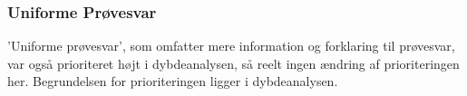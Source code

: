 \subsubsection{Uniforme Prøvesvar}
’Uniforme prøvesvar’, som omfatter mere information og forklaring til prøvesvar, var også prioriteret højt i dybdeanalysen, så reelt ingen ændring af prioriteringen her. Begrundelsen for prioriteringen ligger i dybdeanalysen.  
